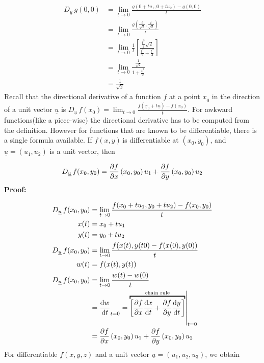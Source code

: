 \documentclass{article}
\newcommand{\n}{\leavevmode \newline} %
\newcommand{\nn}{\leavevmode \newline \newline} %
\newcommand{\fxy}{$f(x,y)\,$} %
\newcommand{\Du}{D_{\underline{u}}\,} %
\numberwithin{equation}{subsection} %
\begin{document}
\begin{equation}
    \begin{split}
        \Du g(0,0) &= \lim_{t\to0}\frac{g(0+tu_1,0+tu_2)-g(0,0)}{t}\\
        &=\lim_{t\to0} \frac{g(\frac{t}{\sqrt{2}},\frac{t}{\sqrt{2}})}{t}\\
        &=\lim_{t\to0} \frac{1}{t} \left[\frac{\frac{t^3}{2}\sqrt{2}}{\frac{t^2}{2}+\frac{t^4}{4}} \right]\\
        &=\lim_{t\to0} \frac{\frac{1}{\sqrt{2}}}{1+\frac{t^2}{2}}\\
        &= \frac{1}{\sqrt{2}}
    \end{split}
\end{equation}
\n
Recall that the directional derivative of a function $f$ at a point $\underline{x}_0$ in the direction of a unit vector $\underline{u}$ is $\Du f(x_0)=\lim_{t\to0} \frac{f(\underline{x}_0+t\underline{u})-f(x_0)}{t}$. For awkward functions(like a piece-wise) the directional derivative has to be computed from the definition. However for functions that are known to be differentiable, there is a single formula available.
\nn
If \fxy is differentiable at $(x_0,y_0)$, and $\underline{u}=(u_1,u_2)$ is a unit vector, then

\begin{equation}
    \Du f(x_0,y_0) = \pdv{f}{x}\left(x_0,y_0\right)u_1 + \pdv{f}{y}\left(x_0,y_0\right)u_2
\end{equation}
\n
\textbf{Proof:}

\begin{equation}
    \begin{split}
        \Du f(x_0,y_0) &= \lim_{t\to0} \frac{f(x_0+tu_1,y_0+tu_2)-f(x_0,y_0)}{t}\\
        x(t) &= x_0+tu_1\\
        y(t) &= y_0+tu_2\\
        \Du f(x_0,y_0) &= \lim_{t\to0} \frac{f(x(t),y(t0)-f(x(0),y(0))}{t}\\
        w(t) &= f(x(t),y(t))\\
        \Du f(x_0,y_0) &= \lim_{t\to0} \frac{w(t)-w(0)}{t}\\
        &= \dv{w}{t}_{t=0}\left. = \overbracket{\left[\pdv{f}{x}\dv{x}{t}+\pdv{f}{y}\dv{y}{t}\right]}^{\text{chain rule}} \right|_{t=0}\\
        &= \pdv{f}{x}\left(x_0,y_0\right)u_1 + \pdv{f}{y}\left(x_0,y_0\right)u_2
    \end{split}
\end{equation}
\n
For differentiable $f(x,y,z)$ and a unit vector $\underline{u}=(u_1,u_2,u_3)$, we obtain
\end{document}
